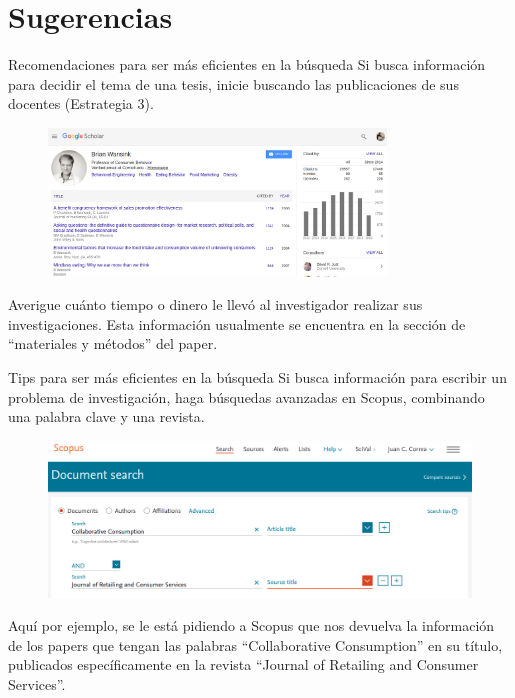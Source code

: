 \documentclass[9pt]{beamer}
\begin{document}
\section{Sugerencias}
\begin{frame}{Recomendaciones para ser más eficientes en la búsqueda}
Si busca información para decidir el tema de una tesis, inicie buscando las publicaciones de sus docentes (Estrategia 3). 
\begin{figure}
\centering
 \includegraphics[width=0.8\textwidth]{b9}
\end{figure}
Averigue cuánto tiempo o dinero le llevó al investigador realizar sus investigaciones. Esta información usualmente se encuentra en la sección de ``materiales y métodos'' del paper.
\end{frame}

\begin{frame}{Tips para ser más eficientes en la búsqueda}
Si busca información para escribir un problema de investigación, haga búsquedas avanzadas en Scopus, combinando una palabra clave y una revista.
\begin{figure}
\centering
 \includegraphics[width=1\textwidth]{b13}
\end{figure}
Aquí por ejemplo, se le está pidiendo a Scopus que nos devuelva la información de los papers que tengan las palabras ``Collaborative Consumption'' en su título, publicados específicamente en la revista ``Journal of Retailing and Consumer Services''.
\end{frame}
\end{document}
